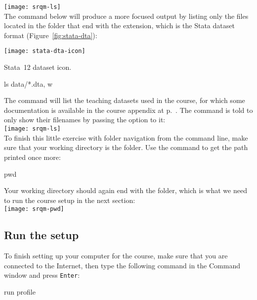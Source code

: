 		\texttt{[image: srqm-ls]}\\[1em]
			
	The  command below will produce a more focused output by listing only the files located in the \data folder that end with the  extension, which is the Stata dataset format (Figure~\ref{fig:stata-dta}):%

		\begin{marginfigure}
			\texttt{[image: stata-dta-icon]}
			\caption{Stata~12 dataset icon.}
			\label{fig:stata-dta}
		\end{marginfigure}

		\begin{docspec}
			ls data/*.dta, w
		\end{docspec}
			 
	The command will list the teaching datasets used in the course, for which some documentation is available in the course appendix at p.~\pageref{sec:data-sources}. The  command is told to only show their filenames by passing the  option to it:\\[1em]%
 
		\texttt{[image: srqm-ls]}\\[1em]
	
	To finish this little exercise with folder navigation from the command line, make sure that your working directory is the \SRQM folder. Use the  command to get the path printed once more:%
	
		\begin{docspec}
			pwd
		\end{docspec}
	
	Your working directory should again end with the \SRQM folder, which is what we need to run the course setup in the next section:\\[1em]%
	
		\texttt{[image: srqm-pwd]}\\[1em]
  
  \subsection{Run the \SRQM setup}%
		\label{sec:setup}%

	To finish setting up your computer for the course, make sure that you are connected to the Internet, then type the following command in the Command window and press \texttt{Enter}:%
		
		\begin{docspec}
			run profile
		\end{docspec}
	
